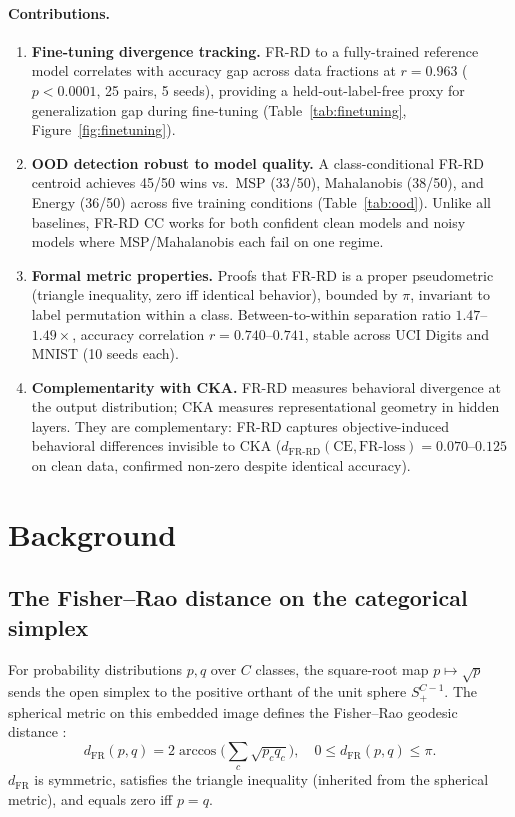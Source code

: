 \documentclass[11pt]{article}
\begin{document}
\paragraph{Contributions.}
\begin{enumerate}
  \item \textbf{Fine-tuning divergence tracking.}
        FR-RD to a fully-trained reference model correlates with accuracy gap across data
        fractions at $r=0.963$ ($p<0.0001$, 25 pairs, 5 seeds), providing a held-out-label-free
        proxy for generalization gap during fine-tuning
        (Table~\ref{tab:finetuning}, Figure~\ref{fig:finetuning}).
  \item \textbf{OOD detection robust to model quality.}
        A class-conditional FR-RD centroid achieves 45/50 wins vs.\ MSP (33/50),
        Mahalanobis (38/50), and Energy (36/50) across five training conditions
        (Table~\ref{tab:ood}). Unlike all baselines, FR-RD CC works for both confident
        clean models and noisy models where MSP/Mahalanobis each fail on one regime.
  \item \textbf{Formal metric properties.}
        Proofs that FR-RD is a proper pseudometric (triangle inequality, zero iff identical
        behavior), bounded by $\pi$, invariant to label permutation within a class.
        Between-to-within separation ratio $1.47$--$1.49\times$, accuracy correlation
        $r=0.740$--$0.741$, stable across UCI Digits and MNIST (10 seeds each).
  \item \textbf{Complementarity with CKA.}
        FR-RD measures behavioral divergence at the output distribution; CKA measures
        representational geometry in hidden layers. They are complementary: FR-RD
        captures objective-induced behavioral differences invisible to CKA
        ($d_\mathrm{FR\text{-}RD}(\mathrm{CE},\mathrm{FR\text{-}loss}) = 0.070$--$0.125$
        on clean data, confirmed non-zero despite identical accuracy).
\end{enumerate}

\section{Background}

\subsection{The Fisher--Rao distance on the categorical simplex}

For probability distributions $p, q$ over $C$ classes, the square-root map $p \mapsto
\sqrt{p}$ sends the open simplex to the positive orthant of the unit sphere $S^{C-1}_+$.
The spherical metric on this embedded image defines the Fisher--Rao geodesic distance
\citep{rao1945information,nielsen2020elementary}:
\begin{equation}
  d_{\mathrm{FR}}(p,q)
  = 2\arccos\!\Big(\textstyle\sum_c \sqrt{p_c q_c}\Big),
  \quad 0 \le d_{\mathrm{FR}}(p,q) \le \pi.
\end{equation}
$d_{\mathrm{FR}}$ is symmetric, satisfies the triangle inequality (inherited from the
spherical metric), and equals zero iff $p = q$.
\end{document}
